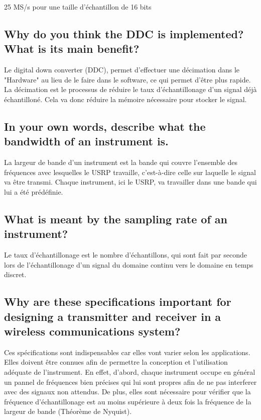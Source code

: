 \documentclass[11pt]{article}
\begin{document}
25 MS/s pour une taille d'échantillon de 16 bits

\subsection{Why do you think the DDC is implemented? What is its main benefit?}

Le digital down converter (DDC), permet d'effectuer une décimation dans le "Hardware" au lieu de le faire dans le software, ce qui permet d'être plus rapide. La décimation est le processus de réduire le taux d'échantillonage d'un signal déjà échantilloné. Cela va donc réduire la mémoire nécessaire pour stocker le signal.

\subsection{In your own words, describe what the bandwidth of an instrument is.}

La largeur de bande d'un instrument est la bande qui couvre l'ensemble des fréquences avec lesquelles le USRP travaille, c'est-à-dire celle sur laquelle le signal va être transmi. Chaque instrument, ici le USRP, va travailler dans une bande qui lui a été prédéfinie.

\subsection{What is meant by the sampling rate of an instrument?}

Le taux d'échantillonage est le nombre d'échantillons, qui sont fait par seconde lors de l'échantillonage d'un signal du domaine continu vers le domaine en temps discret.

\subsection{Why are these specifications important for designing a transmitter and
receiver in a wireless communications system?}

Ces spécifications sont indispensables car elles vont varier selon les applications. Elles doivent être connues afin de permettre la conception et l'utilisation adéquate de l'instrument.
En effet, d'abord, chaque instrument occupe en général un pannel de fréquences bien précises qui lui sont propres afin de ne pas interferer avec des signaux non attendus. De plus, elles sont nécessaire pour vérifier que la fréquence d'échantillonage est au moins supérieure à deux fois la fréquence de la largeur de bande (Théorème de Nyquist).
\end{document}
